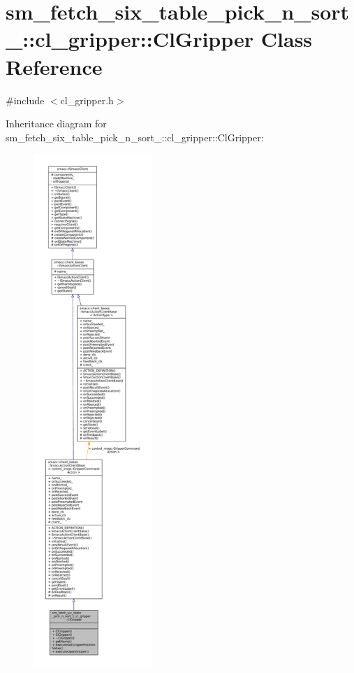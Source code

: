 \hypertarget{classsm__fetch__six__table__pick__n__sort__1_1_1cl__gripper_1_1ClGripper}{}\section{sm\+\_\+fetch\+\_\+six\+\_\+table\+\_\+pick\+\_\+n\+\_\+sort\+\_\+:\+:cl\+\_\+gripper\+:\+:Cl\+Gripper Class Reference}
\label{classsm__fetch__six__table__pick__n__sort__1_1_1cl__gripper_1_1ClGripper}


{\ttfamily \#include $<$cl\+\_\+gripper.\+h$>$}



Inheritance diagram for sm\+\_\+fetch\+\_\+six\+\_\+table\+\_\+pick\+\_\+n\+\_\+sort\+\_\+:\+:cl\+\_\+gripper\+:\+:Cl\+Gripper\+:
\nopagebreak
\begin{figure}[H]
\begin{center}
\leavevmode
\includegraphics[height=550pt]{classsm__fetch__six__table__pick__n__sort__1_1_1cl__gripper_1_1ClGripper__inherit__graph}
\end{center}
\end{figure}


